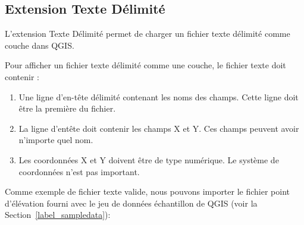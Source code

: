 
\subsection{Extension Texte Délimité}\label{label_dltext}    


L'extension Texte Délimité permet de charger un fichier texte délimité comme 
couche dans QGIS. 


Pour afficher un fichier texte délimité comme une couche, le fichier texte 
doit contenir :

\begin{enumerate}      
\item Une ligne d'en-tête délimité contenant les noms des champs. Cette ligne 
doit être la première du fichier.
\item La ligne d'entête doit contenir les champs X et Y. Ces champs peuvent 
avoir n'importe quel nom.
\item Les coordonnées X et Y doivent être de type numérique. Le système de 
coordonnées n'est pas important.
\end{enumerate}

Comme exemple de fichier texte valide, nous pouvons importer le fichier point 
d'élévation  fourni avec le jeu de données échantillon de 
QGIS (voir la Section~\ref{label_sampledata}):

